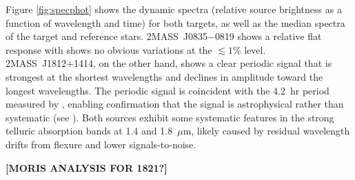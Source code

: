 \documentclass[twocolumn]{aastex6}
\newcommand{\sha}{2MASS~J0835$-$0819}
\newcommand{\shb}{2MASS~J1812+1414}
\begin{document}
Figure \ref{fig:specphot} shows the dynamic spectra (relative source brightness as a function of wavelength and time) for both targets, as well as the median spectra of the target and reference stars.  
{\sha} shows a relative flat response with shows no obvious variations at the $\lesssim1$\% level.
{\shb}, on the other hand, shows a clear periodic signal that is strongest at the shortest wavelengths and declines in amplitude toward the longest wavelengths. The periodic signal is coincident with the 4.2~hr period measured by \citet{2015ApJ...799..154M}, enabling confirmation that the signal is astrophysical rather than systematic (see \citealt{2016ApJ...826..156S}).
Both sources exhibit some systematic features in the strong telluric absorption bands at 1.4 and 1.8~$\mu$m, likely caused by residual wavelength drifts from flexure and lower signals-to-noise.

{\bf [MORIS ANALYSIS FOR 1821?]}
\end{document}
